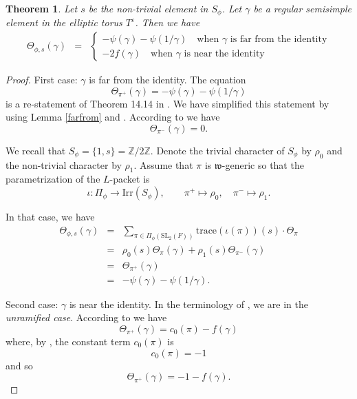 \documentclass[11pt]{amsart}
\numberwithin{equation}{section}
\newtheorem{thm}[equation]{Theorem}
\def\Irr{\mathrm{Irr}}
\def\fw{\mathfrak{w}}
\def\Z{\mathbb{Z}}
\def\SL{\mathrm{SL}}
\def\trace{\mathrm{trace}}
\newcommand{\<}{\left\langle}
\renewcommand{\>}{\right\rangle}
\begin{document}
\begin{thm}\label{vch}  Let $s$ be the non-trivial element in $S_\phi$.   Let $\gamma$ be a regular semisimple element 
in the elliptic torus $T^\varepsilon$. Then we have
\begin{eqnarray*}
\Theta_{\phi, s} (\gamma) & = &
\begin{cases}
 -\psi(\gamma) - \psi(1/\gamma) \quad  \text{when $\gamma$ is far from the identity} \\
-2f(\gamma) \quad \text{when $\gamma$ is near the identity} 
\end{cases}
\end{eqnarray*}
\end{thm}
\begin{proof}   First case: $\gamma$ is far from the identity.    The equation 
\[
\Theta_{\pi^+}(\gamma) = -\psi(\gamma) - \psi(1/\gamma)
\]
 is a re-statement of Theorem 14.14 in \cite{ADSS}.   We have simplified this statement  by using Lemma \ref{farfrom} and \cite[Lemma 4.2]{ADSS}.   
 According to \cite[Theorem 14.14]{ADSS} we have
 \[
 \Theta_{\pi^-}(\gamma) = 0.
 \]
 
 We recall that $S_\phi = \{1,s\} = \Z /2\Z$.  Denote the trivial character of $S_\phi$ by $\rho_0$ and the non-trivial 
character by $\rho_1$.   Assume that $\pi$ is 
$\fw$-generic so that the parametrization of the $L$-packet is 
\[
\iota \colon \Pi_\phi \to \Irr(S_\phi), \quad \quad \pi^+ \mapsto \rho_0, \quad \pi^- \mapsto \rho_1.
\]
 
 In that case, we have
\begin{eqnarray*}                                                       
\Theta_{\phi, s}(\gamma) &=& \sum_{\pi\in\Pi_\phi(\SL_2(F)) } \trace(\iota(\pi))(s) \cdot \Theta_{\pi}\\
&=& \rho_0(s) \Theta_\pi(\gamma) + \rho_1(s)\Theta_{\pi^-}(\gamma)\\
&=& \Theta_{\pi^+}(\gamma)\\
&=& -\psi(\gamma) - \psi(1/\gamma).
\end{eqnarray*}

Second case: $\gamma$ is near the identity.    In the terminology of \cite[Definition 14.1]{ADSS}, we are in the \emph{unramified case}.  According to \cite[Theorem 14.20]{ADSS} we have
 \[
 \Theta_{\pi^+}(\gamma) = c_0(\pi) - f(\gamma)
 \]
 where, by \cite[Definition 14.17]{ADSS}, the constant term $c_0(\pi)$ is 
 \[c_0(\pi) = -1
 \]
 and so
\[
\Theta_{\pi^+}( \gamma) = -1 - f(\gamma).
\]


\end{proof}
\end{document}
